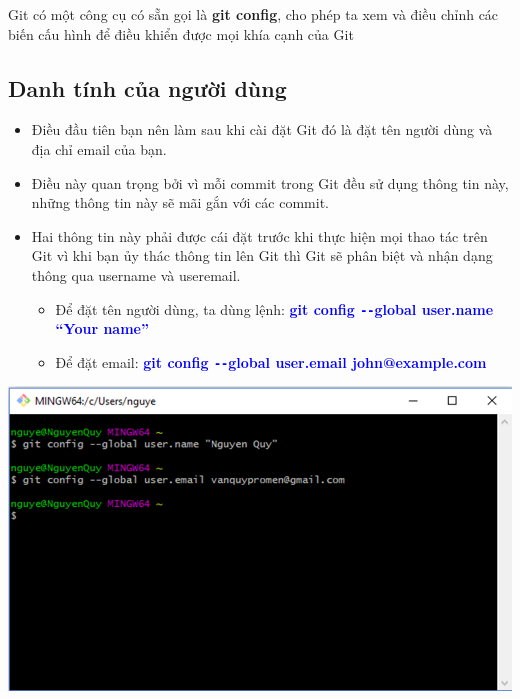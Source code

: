 \documentclass[12pt,a4paper]{report}
\begin{document}
Git có một công cụ có sẵn gọi là \textbf{git config}, cho phép ta xem và điều chỉnh các biến cấu hình để điều khiển được mọi khía cạnh của Git 
\subsection{Danh tính của người dùng}
\begin{itemize}
\item Điều đầu tiên bạn nên làm sau khi cài đặt Git đó là đặt tên người dùng và địa chỉ email của bạn.
\item Điều này quan trọng bởi vì mỗi commit trong Git đều sử dụng thông tin này, những thông tin này sẽ mãi gắn với các commit.
\item Hai thông tin này phải được cái đặt trước khi thực hiện mọi thao tác trên Git vì khi bạn ủy thác thông tin lên Git thì Git sẽ phân biệt và nhận dạng thông qua username và useremail.
	\begin{itemize}
		\item Để đặt tên người dùng, ta dùng lệnh: \textcolor{blue}{\bf  git config \texttt{-{}-}global user.name “Your name”}
		\item Để đặt email: \textcolor{blue}{\bf git config \texttt{-{}-}global user.email john@example.com}
	\end{itemize}
\end{itemize}
	\includegraphics[width=0.8\linewidth]{screenshot001}
	\label{fig:screenshot001}
\vskip 0.4cm
\vskip 0.4cm
\end{document}
